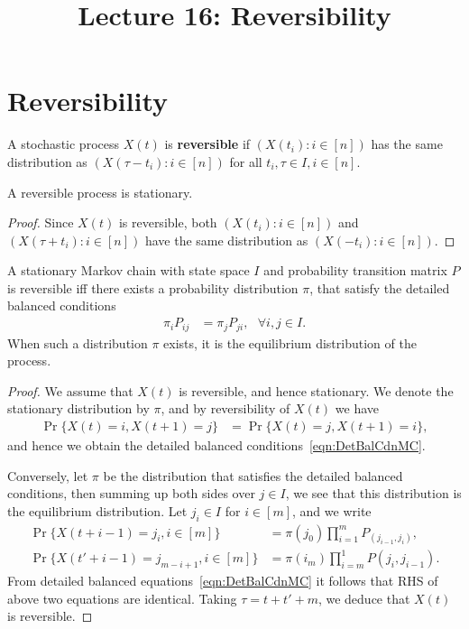 \documentclass[a4paper,10pt,english]{article}
\title{Lecture 16: Reversibility}
\author{}
\begin{document}
\maketitle

\section{Reversibility}
\begin{defn}
A stochastic process $X(t)$ is \textbf{reversible} if $(X(t_i): i \in [n])$ has the same distribution as $(X(\tau-t_i): i \in [n])$ for all $t_i, \tau \in I, i \in [n]$.
\end{defn}
\begin{lem} A reversible process is stationary.
\end{lem}
\begin{proof}
Since $X(t)$ is reversible, both $(X(t_i): i\in [n])$ and $(X(\tau+t_i): i \in [n])$ have the same distribution as $(X(-t_i): i \in [n])$.
\end{proof}
\begin{thm} A stationary Markov chain with state space $I$ and probability transition matrix $P$ is reversible iff there exists a probability distribution $\pi$, that satisfy the detailed balanced conditions
\begin{align}
\label{eqn:DetBalCdnMC}
\pi_iP_{ij} &= \pi_jP_{ji},~~~ \forall i,j \in I.
\end{align}
When such a distribution $\pi$ exists, it is the equilibrium distribution of the process.
\end{thm}
\begin{proof} We assume that $X(t)$ is reversible, and hence stationary. We denote the stationary distribution by $\pi$, and by reversibility of $X(t)$ we have
\begin{align*}
\Pr\{X(t) = i , X(t+1) = j\} &= \Pr\{X(t) = j, X(t+1) = i\},
\end{align*}
and hence we obtain the detailed balanced conditions~\eqref{eqn:DetBalCdnMC}. 

Conversely, let $\pi$ be the distribution that satisfies the detailed balanced conditions, then
summing up both sides over $j \in I$, we see that this distribution is the equilibrium distribution.
Let $j_i \in I$ for $i \in [m]$, and we write
\begin{align*}
\Pr\{X(t+i-1) = j_i, i \in [m]\} &= \pi(j_0)\prod_{i=1}^mP_(j_{i-1},j_{i}),\\
\Pr\{X(t'+i-1) = j_{m-i+1}, i \in [m]\} &= \pi(i_m)\prod_{i=m}^{1}P(j_i,j_{i-1}).
\end{align*}
From detailed balanced equations~\eqref{eqn:DetBalCdnMC} it follows that RHS of above two equations are identical. Taking $\tau = t+t'+m$, we deduce that $X(t)$ is reversible.
\end{proof}
\end{document}
